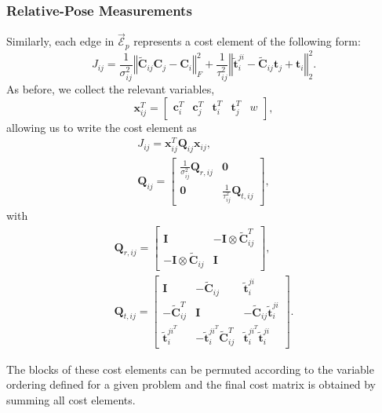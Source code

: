 \documentclass[lettersize,journal]{IEEEtran}
\newcommand{\EdgeSet}{\vec{\bm{\mathcal{E}}}}
\begin{document}
\subsubsection{Relative-Pose Measurements}

Similarly, each edge in $\EdgeSet_p$ represents a cost element of the following form:
\begin{equation}
	J_{ij} = \frac{1}{\sigma^2_{ij}} \left\Vert \tilde{\bm{C}}_{ij}\bm{C}_j - \bm{C}_i\right\Vert_F^2 + \frac{1}{\tau^2_{ij}} \left\Vert \tilde{\bm{t}}^{ji}_{i} - \tilde{\bm{C}}_{ij}\bm{t}_j + \bm{t}_i \right\Vert_2^2.
\end{equation}
As before, we collect the relevant variables,
\begin{equation*}
	\bm{x}_{ij}^T = \begin{bmatrix} \bm{c}_i^T&\bm{c}_j^T  & \bm{t}_i^T & \bm{t}_j^T & w\end{bmatrix},
\end{equation*}
allowing us to write the cost element as
\begin{gather*}
	J_{ij}= \bm{x}_{ij}^T\bm{Q}_{ij}\bm{x}_{ij}, \\
	\bm{Q}_{ij} = \begin{bmatrix}
		\frac{1}{\sigma^2_{ij}}\bm{Q}_{r,ij} & \bm{0}\\
		\bm{0}&\frac{1}{\tau^2_{ij}}\bm{Q}_{t,ij}
	\end{bmatrix},
\end{gather*}
with
\begin{gather*}
	\bm{Q}_{r,ij}=\begin{bmatrix}
		\bm{I}  &  -\bm{I}\otimes\tilde{\bm{C}}_{ij}^T\\
		-\bm{I}\otimes\tilde{\bm{C}}_{ij} & \bm{I}
	\end{bmatrix}, \\ 
	\bm{Q}_{t,ij}=\begin{bmatrix}
		\bm{I}  &  -\tilde{\bm{C}}_{ij} & \tilde{\bm{t}}_{i}^{ji}\\
		-\tilde{\bm{C}}_{ij}^T & \bm{I} & -\tilde{\bm{C}}_{ij}\tilde{\bm{t}}_{i}^{ji}\\
		\tilde{\bm{t}}_{i}^{ji^T} &  -\tilde{\bm{t}}_{i}^{ji^T}\tilde{\bm{C}}_{ij}^T & \tilde{\bm{t}}_{i}^{ji^T} \tilde{\bm{t}}_{i}^{ji}
	\end{bmatrix}.
\end{gather*}

The blocks of these cost elements can be permuted according to the variable ordering defined for a given problem and the final cost matrix is obtained by summing all cost elements.
\end{document}
